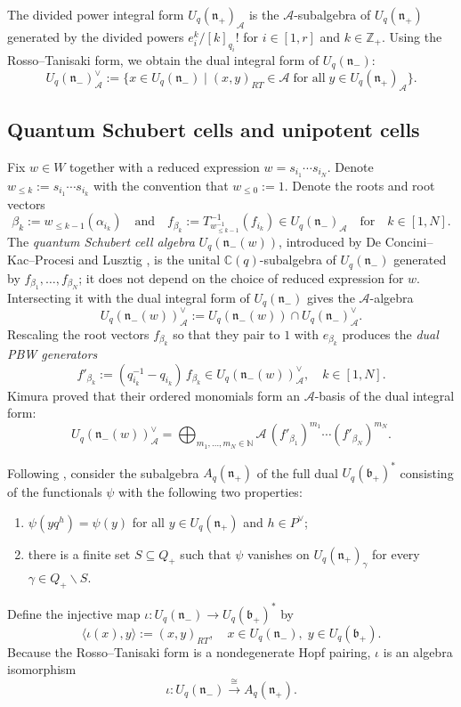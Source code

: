\documentclass[11pt]{amsart}
\theoremstyle{plain}
\def \Zset {{\mathbb Z}}
\def \Cset {{\mathbb C}}
\def \Nset {{\mathbb N}}
\def \cA {\mathcal{A}}
\def \al {\alpha}
\def \be {\beta}
\def \n  {\mathfrak{n}}
\def \b  {\mathfrak{b}}
\begin{document}
The divided power integral form $U_q(\n_+)_\cA$ is the $\cA$-subalgebra of $U_q(\n_+)$ generated by the divided powers $e_i^k / [k]_{q_i}!$ for $i \in [1,r]$ and $k \in \Zset_+$. Using the Rosso--Tanisaki form, we obtain the dual integral form of $U_q(\n_-)$:
\[
U_q(\n_-)^\vee_{\cA} := \{ x \in U_q(\n_-) \mid (x, y)_{RT} \in \cA \; \mbox{for all} \; y \in U_q(\n_+)_{\cA} \}.
\]
\subsection{Quantum Schubert cells and unipotent cells}
\label{unip-Schubert}
Fix $w \in W$ together with a reduced expression $w = s_{i_1} \cdots s_{i_N}$. Denote $w_{\leq k} := s_{i_1} \cdots s_{i_k}$ with the convention that $w_{\leq 0} := 1$. Denote the roots and root vectors 
\[
\be_k := w_{\leq k-1}(\al_{i_k})
\quad \mbox{and} \quad 
f_{\be_k} := T^{-1}_{w_{\leq k-1}^{-1}} (f_{i_k}) \in U_q(\n_-)_{\cA}
\quad \mbox{for} \quad k \in [1,N].
\]
The {\em{quantum Schubert cell algebra}} $U_q(\n_-(w))$, introduced by De Concini--Kac--Procesi \cite{DKP95} and Lusztig \cite{Lus93}, is the unital $\Cset(q)$-subalgebra of $U_q(\n_-)$ generated by $f_{\be_1}, \ldots, f_{\be_N}$; it does not depend on the choice of reduced expression for $w$. Intersecting it with the dual integral form of $U_q(\n_-)$ gives the $\cA$-algebra
\[
U_q(\n_-(w))^\vee_{\cA} := U_q(\n_-(w)) \cap U_q(\n_-)^\vee_{\cA}.
\]
Rescaling the root vectors $f_{\be_k}$ so that they pair to $1$ with $e_{\be_k}$ produces the {\em{dual PBW generators}}
\[
f'_{\be_k} := (q_{i_k}^{-1} - q_{i_k}) \, f_{\be_k} \in U_q(\n_-(w))^\vee_{\cA}, \quad k \in [1,N].
\]
Kimura \cite[Proposition 4.26 and Theorems 4.25, 4.27]{Kim17} proved that their ordered monomials form an $\cA$-basis of the dual integral form:
\begin{equation}
\label{unip-PBW}
U_q(\n_-(w))^\vee_{\cA} = \bigoplus_{m_1, \ldots, m_N \in \Nset} \cA \, (f'_{\be_1})^{m_1} \cdots (f'_{\be_N})^{m_N}.
\end{equation}

Following \cite{GLS}, consider the subalgebra $A_q(\n_+)$ of the full dual $U_q(\b_+)^*$ consisting of the functionals $\psi$ with the following two properties:
\begin{enumerate}
\item[(1)] $\psi(y q^h) = \psi(y)$ for all $y \in U_q(\n_+)$ and $h \in P^\vee$;
\item[(2)] there is a finite set $S \subseteq Q_+$ such that $\psi$ vanishes on $U_q(\n_+)_\gamma$ for every $\gamma \in Q_+ \backslash S$.
\end{enumerate}
Define the injective map $\iota : U_q(\n_-) \to U_q(\b_+)^*$ by 
\[
\langle \iota(x), y \rangle := (x, y)_{RT}, \quad x \in U_q(\n_-), \; y \in U_q(\b_+).
\]
Because the Rosso--Tanisaki form is a nondegenerate Hopf pairing, $\iota$ is an algebra isomorphism
\begin{equation}
\label{unip-iota-int}
\iota : U_q(\n_-) \stackrel{\cong}{\longrightarrow} A_q(\n_+).
\end{equation}
\end{document}
